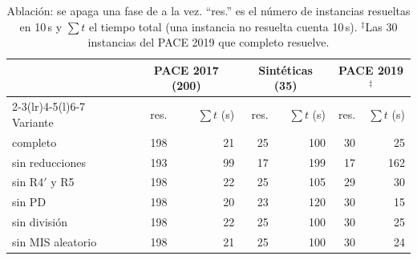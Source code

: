 \begin{table}[!htbp]\centering\small
\begin{tabular}{@{}lrrrrrr@{}}\toprule
 & \multicolumn{2}{c}{PACE 2017 (200)} & \multicolumn{2}{c}{Sintéticas (35)} & \multicolumn{2}{c}{PACE 2019$^\ddagger$} \\\cmidrule(lr){2-3}\cmidrule(lr){4-5}\cmidrule(l){6-7}
Variante & res. & $\sum t$ (s) & res. & $\sum t$ (s) & res. & $\sum t$ (s) \\\midrule
\hyvc{} completo & 198 & 21 & 25 & 100 & 30 & 25 \\
sin reducciones & 193 & 99 & 17 & 199 & 17 & 162 \\
sin R4$'$ y R5 & 198 & 22 & 25 & 105 & 29 & 30 \\
sin PD & 198 & 20 & 23 & 120 & 30 & 15 \\
sin división & 198 & 22 & 25 & 100 & 30 & 25 \\
sin MIS aleatorio & 198 & 21 & 25 & 100 & 30 & 24 \\
\bottomrule\end{tabular}
\caption{Ablación: se apaga una fase de \hyvc{} a la vez. ``res.'' es el número de instancias resueltas en 10\,s y $\sum t$ el tiempo total (una instancia no resuelta cuenta 10\,s). $^\ddagger$Las 30 instancias del PACE 2019 que \hyvc{} completo resuelve.}\label{tab:ablacion}\end{table}
